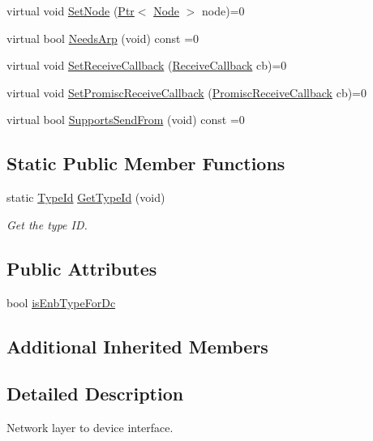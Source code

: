\begin{DoxyCompactItemize}
\item 
virtual void \hyperlink{classns3_1_1NetDevice_a3ae520ae06e93b957f0f56f113319a08}{Set\+Node} (\hyperlink{classns3_1_1Ptr}{Ptr}$<$ \hyperlink{classns3_1_1Node}{Node} $>$ node)=0
\item 
virtual bool \hyperlink{classns3_1_1NetDevice_ab1a133696310cad3dc2c3d1a4993f310}{Needs\+Arp} (void) const =0
\item 
virtual void \hyperlink{classns3_1_1NetDevice_ac63e4d5668e421fec4b5d37f32e7dd18}{Set\+Receive\+Callback} (\hyperlink{classns3_1_1NetDevice_ad5e5e1ca187472bc2ba99575d8def568}{Receive\+Callback} cb)=0
\item 
virtual void \hyperlink{classns3_1_1NetDevice_a3968946bdbb74d47d7b13612baad7d6d}{Set\+Promisc\+Receive\+Callback} (\hyperlink{classns3_1_1NetDevice_a427225795919f26c414bee2ea3f31ed2}{Promisc\+Receive\+Callback} cb)=0
\item 
virtual bool \hyperlink{classns3_1_1NetDevice_a04793d220b54c40e110ebf86dae5b25c}{Supports\+Send\+From} (void) const =0
\end{DoxyCompactItemize}
\subsection*{Static Public Member Functions}
\begin{DoxyCompactItemize}
\item 
static \hyperlink{classns3_1_1TypeId}{Type\+Id} \hyperlink{classns3_1_1NetDevice_a1f4382ff11dff7d4634b2e641afa4346}{Get\+Type\+Id} (void)
\begin{DoxyCompactList}\small\item\em Get the type ID. \end{DoxyCompactList}\end{DoxyCompactItemize}
\subsection*{Public Attributes}
\begin{DoxyCompactItemize}
\item 
bool \hyperlink{classns3_1_1NetDevice_a3427aa98959cb2437e97a51fa50d93eb}{is\+Enb\+Type\+For\+Dc}
\end{DoxyCompactItemize}
\subsection*{Additional Inherited Members}


\subsection{Detailed Description}
Network layer to device interface. 

